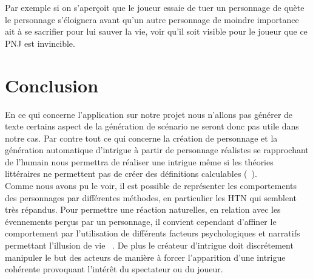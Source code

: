 \documentclass[asi]{picINSA}
\begin{document}
Par exemple si on s'aperçoit que le joueur essaie de tuer un personnage de quète le personnage s'éloignera avant qu'un autre 
personnage de moindre importance ait à se sacrifier pour lui sauver la vie, voir qu'il soit visible pour le joueur que ce PNJ est invincible. \\

\chapter*{Conclusion}

En ce qui concerne l'application sur notre projet nous n'allons pas générer de texte certains aspect de la génération de 
scénario ne seront donc pas utile dans notre cas. Par contre tout ce qui concerne la création de personnage et la
 génération automatique d'intrigue à partir de personnage réalistes se rapprochant de l'humain nous permettra de
  réaliser une intrigue même si les théories littéraires ne permettent pas de créer des définitions calculables (~\cite{Callaway2002213}). \\

Comme nous avons pu le voir, il est possible de représenter les comportements des personnages par différentes méthodes,
 en particulier les HTN qui semblent très répandus. Pour permettre une réaction naturelles, en relation avec 
 les évennements perçus par un personnage, il convient cependant d'affiner le comportement par l'utilisation de 
 différents facteurs psychologiques et narratifs permettant l'illusion de vie ~\cite{Bates94therole}. 
 De plus le créateur d'intrigue doit discrétement manipuler le but des acteurs de manière à forcer l'apparition d'une 
 intrigue cohérente provoquant l'intérêt du spectateur ou du joueur.


{}

\end{document}
